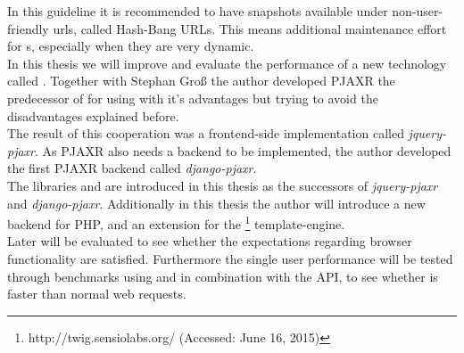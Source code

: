 In this guideline it is recommended to have snapshots available under non-user-friendly \gls{url}s, called Hash-Bang URLs.
This means additional maintenance effort for \webSite{}s, especially when they are very dynamic.
\\
In this thesis we will improve and evaluate the performance of a new technology called \lare{}.
Together with Stephan Gro{\ss} the author developed PJAXR the predecessor of \lare{} for using \ajax{} with it's advantages but trying to avoid the disadvantages explained before.
\\
The result of this cooperation was a frontend-side implementation called \emph{jquery-pjaxr}.
As PJAXR also needs a backend to be implemented, the author developed the first PJAXR backend called \emph{django-pjaxr}.
\\
The libraries \lareJS{} and \djangoLare{} are introduced in this thesis as the successors of \emph{jquery-pjaxr} and \emph{django-pjaxr}.
Additionally in this thesis the author will introduce a new \lare{} backend for PHP, \emph{\phpLare{}} and \emph{\twigLare{}} an extension for the \twig{}\footnote{http://twig.sensiolabs.org/ (Accessed: June 16, 2015)} template-engine.
\\
Later \lare{} will be evaluated to see whether the expectations regarding browser functionality are satisfied.
Furthermore the single user performance will be tested through benchmarks using \curl{} and \selenium{} in combination with the \webdriver{} API, to see whether \lare{} is faster than normal web requests.
